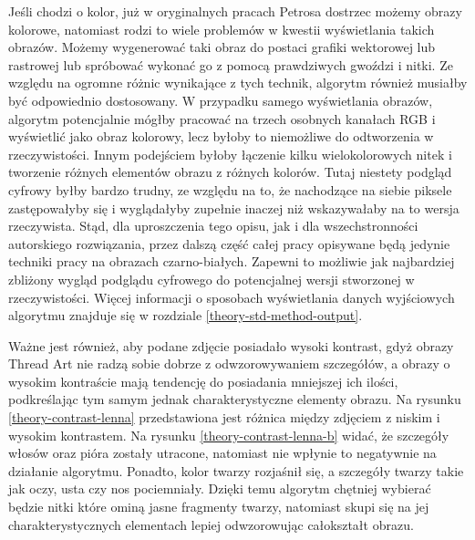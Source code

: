 \documentclass[a4paper, 12pt, polish, twoside]{extreport}
\begin{document}
        Jeśli chodzi o kolor, już w oryginalnych pracach Petrosa dostrzec możemy obrazy kolorowe, natomiast rodzi to wiele problemów w kwestii wyświetlania takich obrazów. Możemy wygenerować taki obraz do postaci grafiki wektorowej lub rastrowej lub spróbować wykonać go z pomocą prawdziwych gwoździ i nitki. Ze względu na ogromne różnic wynikające z tych technik, algorytm również musiałby być odpowiednio dostosowany. W przypadku samego wyświetlania obrazów, algorytm potencjalnie mógłby pracować na trzech osobnych kanałach RGB i wyświetlić jako obraz kolorowy, lecz byłoby to niemożliwe do odtworzenia w rzeczywistości. Innym podejściem byłoby łączenie kilku wielokolorowych nitek i tworzenie różnych elementów obrazu z różnych kolorów. Tutaj niestety podgląd cyfrowy byłby bardzo trudny, ze względu na to, że nachodzące na siebie piksele zastępowałyby się i wyglądałyby zupełnie inaczej niż wskazywałaby na to wersja rzeczywista. Stąd, dla uproszczenia tego opisu, jak i dla wszechstronności autorskiego rozwiązania, przez dalszą część całej pracy opisywane będą jedynie techniki pracy na obrazach czarno-białych. Zapewni to możliwie jak najbardziej zbliżony wygląd podglądu cyfrowego do potencjalnej wersji stworzonej w rzeczywistości. Więcej informacji o sposobach wyświetlania danych wyjściowych algorytmu znajduje się w rozdziale \ref{theory-std-method-output}.
        
        Ważne jest również, aby podane zdjęcie posiadało wysoki kontrast, gdyż obrazy Thread Art nie radzą sobie dobrze z odwzorowywaniem szczegółów, a obrazy o wysokim kontraście mają tendencję do posiadania mniejszej ich ilości, podkreślając tym samym jednak charakterystyczne elementy obrazu. Na rysunku \ref{theory-contrast-lenna} przedstawiona jest różnica między zdjęciem z niskim i wysokim kontrastem. Na rysunku \ref{theory-contrast-lenna-b} widać, że szczegóły włosów oraz pióra zostały utracone, natomiast nie wpłynie to negatywnie na działanie algorytmu. Ponadto, kolor twarzy rozjaśnił się, a szczegóły twarzy takie jak oczy, usta czy nos pociemniały. Dzięki temu algorytm chętniej wybierać będzie nitki które ominą jasne fragmenty twarzy, natomiast skupi się na jej charakterystycznych elementach lepiej odwzorowując całokształt obrazu.
        
\end{document}

